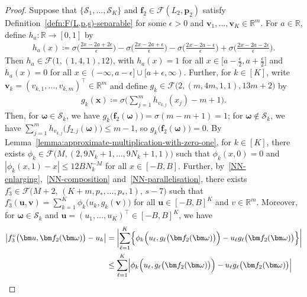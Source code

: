 \documentclass[12pt]{article}
\begin{document}
\begin{proof}
    Suppose that $\{\mathcal{S}_1,\ldots,\mathcal{S}_K\}$ and $\bm f_2 \in \mathcal{F}(L_2,\bm p_2)$ satisfy Definition~\ref{defn:F(L,p,s)-separable} for some $\epsilon>0$ and $\bm v_1,\ldots,\bm v_K \in \mathbb{R}^m$.
    For $a\in\mathbb{R}$, define $h_a:\mathbb{R} \to [0,1]$ by
    \begin{align*}
        h_a(x) \coloneqq \sigma\biggl(\frac{2x-2a+2\epsilon}{\epsilon}\biggr) - \sigma\biggl(\frac{2x-2a+\epsilon}{\epsilon}\biggr) - \sigma\biggl(\frac{2x-2a-\epsilon}{\epsilon}\biggr) +\sigma\biggl(\frac{2x-2a-2\epsilon}{\epsilon}\biggr).
    \end{align*}
    Then $h_a \in \mathcal{F}\bigl(1,(1,4,1),12\bigr)$, with $h_a(x) = 1$ for all $x\in\bigl[a-\frac{\epsilon}{2}, a+\frac{\epsilon}{2}\bigr]$ and $h_a(x) = 0$ for all $x\in(-\infty,a-\epsilon] \cup [a+\epsilon,\infty)$. Further, for $k\in[K]$, write $\bm v_k = (v_{k,1},\ldots,v_{k,m})^\top \in \mathbb{R}^m$ and define $g_k \in \mathcal{F}\bigl(2,(m,4m,1,1),13m+2\bigr)$ by
    \begin{align*}
        g_k(\bm x) \coloneqq \sigma\biggl(\sum_{j=1}^m h_{v_{k,j}}(x_j) - m + 1 \biggr).
    \end{align*}
    Then, for $\bm\omega \in \mathcal{S}_k$, we have $g_k\bigl(\bm f_2(\bm\omega)\bigr) = \sigma(m-m+1) = 1$; for $\bm\omega \notin \mathcal{S}_k$, we have $\sum_{j=1}^m h_{v_{k,j}}\bigl(f_{2,j}(\bm\omega)\bigr) \leq m-1$, so $g_k\bigl(\bm f_2(\bm\omega)\bigr) = 0$. By Lemma~\ref{lemma:approximate-multiplication-with-zero-one}, for $k\in[K]$, there exists $\phi_k \in \mathcal{F}\bigl(M,(2,9N_k+1,\ldots,9N_k+1,1)\bigr)$ such that $\phi_k(x,0) = 0$ and $|\phi_k(x,1) - x| \leq 12BN_k^{-M}$ for all $x\in[-B,B]$. Further, by~\ref{NN-enlarging},~\ref{NN-composition} and~\ref{NN-parallelisation}, there exists $f_3^\circ\in\mathcal{F}\bigl(M+2,\, (K+m,p_*,\ldots,p_*,1),\,  s-7\bigr)$ such that $f_3^\circ(\bm u, \bm v) = \sum_{k=1}^K \phi_k\bigl(u_k, g_k(\bm v)\bigr)$ for all $\bm u \in[-B,B]^K$ and $v\in\mathbb{R}^m$. 
    Moreover, for $\bm\omega \in \mathcal{S}_k$ and $\bm u = (u_1,\ldots,u_K)^\top \in [-B,B]^K$, we have
    \begin{align*}
        \bigl|f_3^\circ\bigl(\bm u, \bm f_2(\bm\omega)\bigr) - u_k \bigr| &= \biggl|\sum_{\ell=1}^K \Bigl\{\phi_k\Bigl(u_{\ell},g_{\ell}\bigl(\bm f_2(\bm\omega)\bigr)\Bigr) - u_{\ell}g_{\ell}\bigl(\bm f_2(\bm\omega)\bigr) \Bigr\}\biggr|\\
        &\leq \sum_{\ell=1}^K \Bigl| \phi_k \Bigl(u_{\ell},g_{\ell}\bigl(\bm f_2(\bm\omega)\bigr)\Bigr) - u_{\ell}g_{\ell}\bigl(\bm f_2(\bm\omega)\bigr) \Bigr|\\

\end{align*}
\end{proof}
\end{document}
